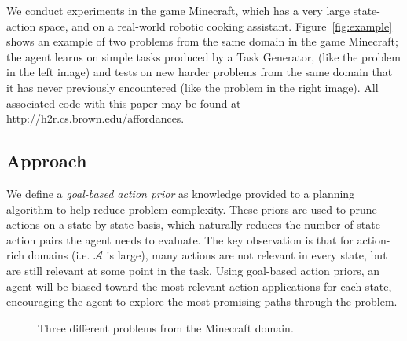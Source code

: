 \documentclass[11pt]{article}
\begin{document}
We conduct experiments in
the game Minecraft, which has a very large state-action space, and on
a real-world robotic cooking assistant.  Figure~\ref{fig:example}
shows an example of two problems from the same domain in the game
Minecraft; the agent learns on simple tasks produced by a Task Generator,
(like the problem in the left image) and tests
on new harder problems from the same domain that it has never previously
encountered (like the problem in the right image). All associated code with this paper may be found at
http://h2r.cs.brown.edu/affordances.


\subsection{Approach}
We define a {\it goal-based action prior} as knowledge provided to a planning algorithm to help reduce problem complexity. These priors are used to prune actions on a state by state basis, which naturally reduces the number of state-action pairs the agent needs to evaluate. The key observation is that for action-rich domains (i.e. $\mathcal{A}$ is large), many actions are not relevant in every state, but are still relevant at some point in the task. Using goal-based action priors, an agent will be biased toward the most relevant action applications for each state, encouraging the agent to explore the most promising paths through the problem.

\begin{figure}[t]
\centering
{}
  \caption{Three different problems from the Minecraft domain.}
  \label{fig:minecraft}
\end{figure}
\end{document}
